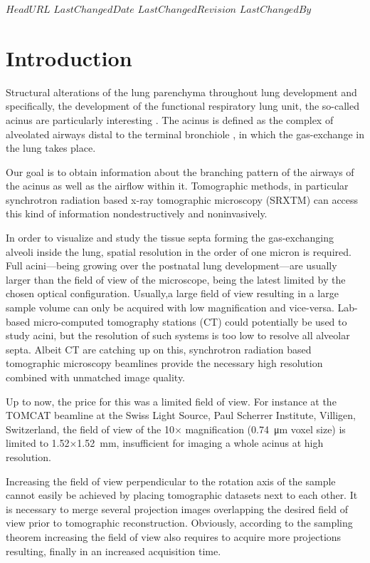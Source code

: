 \svnidlong
{$HeadURL$}
{$LastChangedDate$}
{$LastChangedRevision$}
{$LastChangedBy$}
%
\section{Introduction}
\cbstart
Structural alterations of the lung parenchyma throughout lung development and specifically, the development of the functional respiratory lung unit, the so-called acinus are particularly interesting \cite{Schittny2008,Mund2008,Tsuda2008}.
\cbend
The acinus is defined as the complex of alveolated airways distal to the terminal bronchiole \cite{Rodriguez1987}, in which the gas-exchange in the lung takes place. 

\cbstart
Our goal is to obtain information about the branching pattern of the airways of the acinus as well as the airflow within it. Tomographic methods, in particular synchrotron radiation based x-ray tomographic microscopy (SRXTM) can access this kind of information nondestructively and noninvasively. 

In order to visualize and study the tissue septa forming the gas-exchanging alveoli inside the lung, spatial resolution in the order of one micron is required. Full acini---being growing over the postnatal lung development---are usually larger than the field of view of the microscope, being the latest limited by the chosen optical configuration. Usually,\cbend a large field of view resulting in a large sample volume can only be acquired with low magnification and vice-versa. Lab-based micro-computed tomography stations (\micro CT) \cbstart could potentially be used to study acini, but the resolution of such systems is too low to resolve all alveolar septa. Albeit \micro CT are catching up on this, synchrotron radiation based tomographic microscopy beamlines provide the necessary high resolution combined with unmatched image quality.

Up to now, the price for this was a limited field of view. For instance at the TOMCAT beamline \cite{Stampanoni2007} at the Swiss Light Source, Paul Scherrer Institute, Villigen, Switzerland, the field of view of the 10$\times$ magnification (\SI{0.74}{\micro\meter} voxel size) is limited to 1.52$\times$\SI{1.52}{\milli\meter}, insufficient for imaging a whole acinus at high resolution.\cbend\cbdelete

Increasing the field of view perpendicular to the rotation axis of the sample cannot easily be achieved by placing tomographic datasets next to each other. It is necessary to merge several projection images overlapping the desired field of view \cbstart prior to tomographic reconstruction. Obviously, according to the sampling theorem increasing the field of view also requires to acquire more projections resulting, finally in an increased acquisition time.

